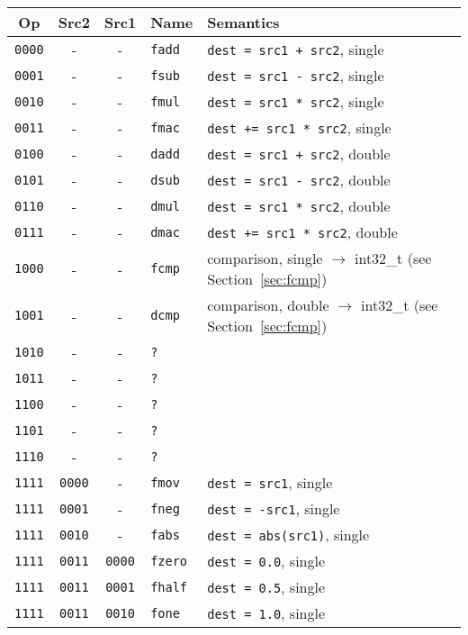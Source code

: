 \documentclass[10pt,DIV12]{scrartcl}
\begin{document}
\begin{tabular}{cccll}
\toprule
Op & Src2 & Src1 & Name & Semantics \\
\midrule
\texttt{0000} & - & - & \texttt{fadd} & \texttt{dest = src1 + src2}, single \\
\texttt{0001} & - & - & \texttt{fsub} & \texttt{dest = src1 - src2}, single \\
\texttt{0010} & - & - & \texttt{fmul} & \texttt{dest = src1 * src2}, single \\
\texttt{0011} & - & - & \texttt{fmac} & \texttt{dest += src1 * src2}, single \\
\texttt{0100} & - & - & \texttt{dadd} & \texttt{dest = src1 + src2}, double \\
\texttt{0101} & - & - & \texttt{dsub} & \texttt{dest = src1 - src2}, double \\
\texttt{0110} & - & - & \texttt{dmul} & \texttt{dest = src1 * src2}, double \\
\texttt{0111} & - & - & \texttt{dmac} & \texttt{dest += src1 * src2}, double \\
\texttt{1000} & - & - & \texttt{fcmp} & comparison, single $\rightarrow$ int32\_t (see Section~\ref{sec:fcmp}) \\
\texttt{1001} & - & - & \texttt{dcmp} & comparison, double $\rightarrow$ int32\_t (see Section~\ref{sec:fcmp}) \\
\texttt{1010} & - & - & \texttt{?} & \\
\texttt{1011} & - & - & \texttt{?} & \\
\texttt{1100} & - & - & \texttt{?} & \\
\texttt{1101} & - & - & \texttt{?} & \\
\texttt{1110} & - & - & \texttt{?} & \\
\texttt{1111} & \texttt{0000} & - & \texttt{fmov} & \texttt{dest = src1}, single \\
\texttt{1111} & \texttt{0001} & - & \texttt{fneg} & \texttt{dest = -src1}, single \\
\texttt{1111} & \texttt{0010} & - & \texttt{fabs} & \texttt{dest = abs(src1)}, single \\
\texttt{1111} & \texttt{0011} & \texttt{0000} & \texttt{fzero} & \texttt{dest = 0.0}, single \\
\texttt{1111} & \texttt{0011} & \texttt{0001} & \texttt{fhalf} & \texttt{dest = 0.5}, single \\
\texttt{1111} & \texttt{0011} & \texttt{0010} & \texttt{fone} & \texttt{dest = 1.0}, single \\

\end{tabular}
\end{document}
